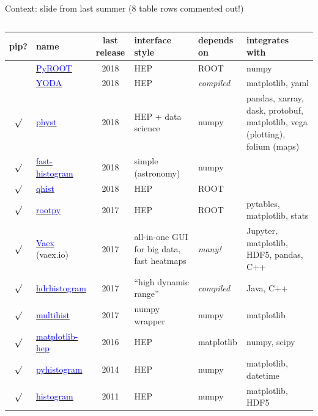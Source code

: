 \documentclass[aspectratio=169]{beamer}
\begin{document}
\begin{frame}{Context: slide from last summer (8 table rows commented out!)}
\scriptsize
\vspace{0.35 cm}
\begin{columns}
\renewcommand{\arraystretch}{1.2}
\begin{tabular}{c l c p{2.7 cm} p{1.5 cm} p{4.75 cm}}
pip? & name & last release & interface style & depends on & integrates with \\\hline
& \href{https://root.cern.ch/pyroot}{\textcolor{blue}{PyROOT}} & 2018 & HEP & ROOT & numpy \\
& \href{https://yoda.hepforge.org/pydoc}{\textcolor{blue}{YODA}} & 2018 & HEP & {\it compiled} & matplotlib, yaml \\
$\surd$ & \href{https://pypi.python.org/pypi/physt}{\textcolor{blue}{physt}} & 2018 & HEP + data science & numpy & pandas, xarray, dask, protobuf, matplotlib, vega (plotting), folium (maps) \\
$\surd$ & \href{https://pypi.org/project/fast-histogram}{\textcolor{blue}{fast-histogram}} & 2018 & simple (astronomy) & numpy & \\
$\surd$ & \href{https://pypi.org/project/qhist/}{\textcolor{blue}{qhist}} & 2018 & HEP & ROOT & \\
$\surd$ & \href{https://pypi.org/project/rootpy}{\textcolor{blue}{rootpy}} & 2017 & HEP & ROOT & pytables, matplotlib, stats \\
$\surd$ & \href{https://vaex.io}{\textcolor{blue}{Vaex}} (vaex.io) & 2017 & all-in-one GUI for big data, fast heatmaps & {\it many!} & Jupyter, matplotlib, HDF5, pandas, C++ \\
$\surd$ & \href{https://pypi.python.org/pypi/hdrhistogram}{\textcolor{blue}{hdrhistogram}} & 2017 & ``high dynamic range'' & {\it compiled} & Java, C++ \\
$\surd$ & \href{https://pypi.python.org/pypi/multihist}{\textcolor{blue}{multihist}} & 2017 & numpy wrapper & numpy & matplotlib \\
$\surd$ & \href{https://github.com/ibab/matplotlib-hep}{\textcolor{blue}{matplotlib-hep}} & 2016 & HEP & matplotlib & numpy, scipy \\
$\surd$ & \href{https://pypi.python.org/pypi/pyhistogram}{\textcolor{blue}{pyhistogram}} & 2014 & HEP & numpy & matplotlib, datetime \\
$\surd$ & \href{https://pypi.python.org/pypi/histogram}{\textcolor{blue}{histogram}} & 2011 & HEP & numpy & matplotlib, HDF5 \\

\end{tabular}
\end{columns}
\end{frame}
\end{document}
